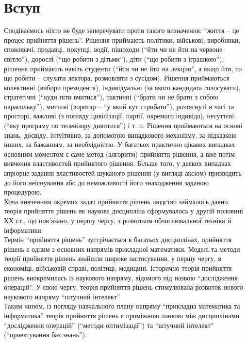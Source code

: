 \section{Вступ}

Сподіваємось ніхто не буде заперечувати проти такого визначення: ``життя -- це процес прийняття рішень''. Рішення приймають політики, військові, виробники, споживачі, продавці, покупці, водії, пішоходи (``йти чи не йти на червоне світло''), дорослі (``що робити з дітьми''), діти (``що робити з іграшкою''), рішення приймають навіть студенти (``йти чи не йти на лекцію'', а якщо йти, то що робити -- слухати лектора, розмовляти з сусідом). Рішення приймаються колективні (вибори президента), індивідуальні (за якого кандидата голосувати), стратегічні (``куди піти вчитися''), тактичні (``брати чи не брати з собою парасольку''), миттєві (воротар -- ``у який кут стрибати''), розтягнуті в часі та просторі, важливі (з погляду цивілізації, партії, окремого індивіда), несуттєві (``яку програму по телевізору дивитися'') і т. п. Рішення приймаються на основі знань, досвіду, інтуїтивно, за допомогою випадкового механізму, за підказкою інших, за бажанням, за необхідністю. У багатьох практично цікавих випадках основним моментом є саме метод (алгоритм) прийняття рішення, а вже потім вивчення властивостей прийнятого рішення. Більше того, у деяких випадках апріорне задання властивостей шуканого рішення (у вигляді аксіом) призводить до його неіснування або до неможливості його знаходження заданою процедурою. \\

Хоча вивченням окремих задач прийняття рішень людство займалось давно, теорія прийняття рішень як наукова дисципліна сформувалось у другій половині ХХ ст., що пов'язано, у першу чергу, з розвитком обчислювальної техніки й інформатики. \\

Термін ``прийняття рішень'' зустрічається в багатьох дисциплінах, прийняття рішень є одним з основних напрямів прикладної математики. Моделі та методи теорії прийняття рішень знайшли широке застосування, у першу чергу, в економіці, військовій справі, політиці, медицині. Історично теорія прийняття рішень виокремилась із наукового напряму, відомого під назвою ``дослідження операцій''. У свою чергу, теорія прийняття рішень стимулювала розвиток нового наукового напряму ``штучний інтелект''. \\

Таким чином, із погляду навчального плану напряму ``прикладна математика та інформатика'' теорія прийняття рішень є проміжною ланкою між дисциплінами ``дослідження операцій'' (``методи оптимізації'') та ``штучний інтелект'' (``проектування баз знань'').